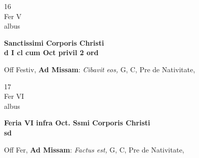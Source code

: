 \documentclass[10pt, openany]{book}
\begin{document}
        \begin{center}
            \begin{minipage}{3.5in}
                \vspace{2em}
                \begin{minipage}{0.5in}
                    {\Huge 16} \\
                    {\normalsize Fer V} \\
                    {\normalsize albus}
                \end{minipage}
                \begin{minipage}{3.0in}
                    \textbf{ \large Sanctissimi Corporis Christi \\
                    \textnormal{\normalsize d I cl cum Oct privil 2 ord}} \\ 
                \end{minipage}
                \begin{justify}Off Festiv, \textbf{Ad Missam}: \textit{Cibavit eos,} G, C, Pre de Nativitate,  
                \end{justify}
            \end{minipage}
        \end{center}
    
        \begin{center}
            \begin{minipage}{3.5in}
                \vspace{2em}
                \begin{minipage}{0.5in}
                    {\Huge 17} \\
                    {\normalsize Fer VI} \\
                    {\normalsize albus}
                \end{minipage}
                \begin{minipage}{3.0in}
                    \textbf{ \large Feria VI infra Oct. Ssmi Corporis Christi \\
                    \textnormal{\normalsize sd}} \\ 
                \end{minipage}
                \begin{justify}Off Fer, \textbf{Ad Missam}: \textit{Factus est,} G, C, Pre de Nativitate,  
                \end{justify}
            \end{minipage}
        \end{center}
    
\end{document}
